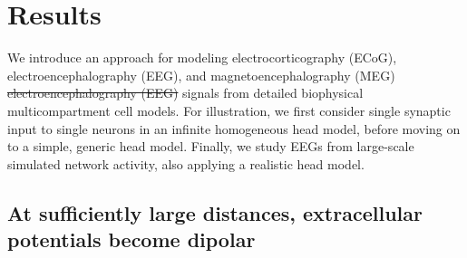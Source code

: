 \documentclass[preprint,10pt,authoryear]{elsarticle}
\newcommand{\hlp}[2][Purple]{ {\sethlcolor{#1} \hl{#2}} }
\newcommand{\tvntxt}[1]{{\color{Emerald}#1}}
\newcommand{\gen}[1]{\color{white}{\hlp{GTE: #1 }}\color{black}}
\begin{document}
\section{Results}\label{sec:results}
\normalsize

We introduce an approach for modeling \tvntxt{electrocorticography (ECoG), electroencephalography (EEG), and magnetoencephalography (MEG) \sout{electroencephalography (EEG)}} signals from detailed biophysical multicompartment cell models. For illustration, we first consider single synaptic input to single neurons in an infinite homogeneous head model, before moving on to a simple, generic head model. Finally, we study EEGs from \tvntxt{large-scale simulated network} activity, also applying a realistic head model. 


%

\subsection{At sufficiently large distances, extracellular potentials become dipolar}\label{subsec:cb_db_comp_inf}
\end{document}
